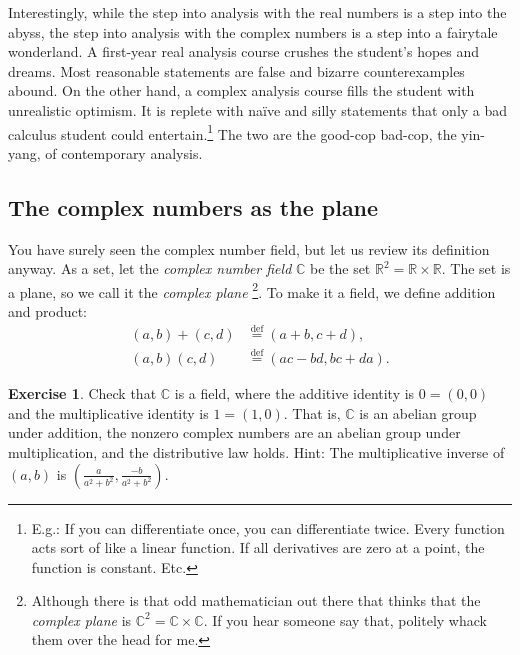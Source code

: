 \documentclass[12pt,openany]{book}
\newcommand{\C}{{\mathbb{C}}}
\newcommand{\R}{{\mathbb{R}}}
\newcommand{\myindex}[1]{#1\index{#1}}
\theoremstyle{plain}
\theoremstyle{remark}
\theoremstyle{definition}
\newenvironment{exbox}{%
    \def\FrameCommand{\vrule width 1pt \relax\hspace{10pt}}%
    \MakeFramed{\advance\hsize-\width\FrameRestore}%
}{%
    \endMakeFramed
}
\theoremstyle{exercise}
\newtheorem{exercise}{Exercise}[section]
\theoremstyle{example}
\begin{document}
Interestingly, while the step into analysis with the real numbers
is a step into the abyss, the step into analysis with the complex numbers is a
step into a fairytale wonderland.  A first-year real analysis course
crushes the student's hopes and dreams.  Most reasonable statements
are false and bizarre counterexamples abound.
On the other hand, a complex analysis course fills the student with
unrealistic optimism.  It is replete with na\"ive and silly statements
that only a bad calculus student could entertain.\footnote{%
E.g.:  If you can differentiate once, you can differentiate twice.
Every function acts sort of like a linear function.
If all derivatives are zero at a point, the function is constant.
Etc.}
The two are the good-cop bad-cop, the yin-yang,
of contemporary analysis.

\subsection{The complex numbers as the plane}

You have surely seen the complex number field,
but let us review its definition anyway.
As a set, let the \emph{\myindex{complex number field}}
$\C$ be the set $\R^2 = \R \times \R$.
The set is a plane, so we call it the \emph{\myindex{complex plane}}%
\footnote{Although there is that odd mathematician out there that
thinks that the \emph{complex plane} is $\C^2 = \C \times \C$.
If you hear someone say that, politely whack them over the head for me.}.
To make it a field, we define addition and product:
\begin{align*}
(a,b) + (c,d) & \overset{\text{def}}{=} (a+b,c+d) , \\
(a,b) (c,d) & \overset{\text{def}}{=} (ac-bd,bc+da) .
\end{align*}

\begin{exbox}
\begin{exercise}%
Check that $\C$ is a field, where the additive
identity is $0=(0,0)$ and the multiplicative identity is $1=(1,0)$.
That is, $\C$ is an abelian group under addition,
the nonzero complex numbers are an abelian group under multiplication,
and the distributive law holds.  Hint: The multiplicative inverse of $(a,b)$
is $\left(\frac{a}{a^2+b^2},\frac{-b}{a^2+b^2}\right)$.
\end{exercise}
\end{exbox}
\end{document}
